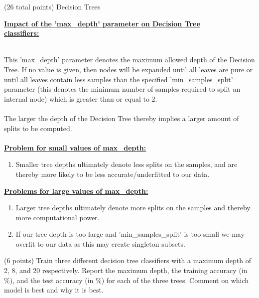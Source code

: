 \documentclass[12pt]{article}
\begin{document}
\begin{question}{(26 total points) Decision Trees}
\begin{subquestion}
\begin{answerbox}{32em}
\large{\textbf{\underline{Impact of the 'max\_depth' parameter on Decision Tree}}}\\
\large{\textbf{\underline{classifiers:}}}\\
\\
\normalsize{
This 'max\_depth' parameter denotes the maximum allowed depth of the Decision Tree. If no value is given, then nodes will be expanded until all leaves are pure or until all leaves contain less samples than the specified 'min\_samples\_split' parameter (this denotes the minimum number of samples required to split an internal node) which is greater than or equal to 2.\\
\\
The larger the depth of the Decision Tree thereby implies a larger amount of splits to be computed.\\
\\
\textbf{\underline{Problem for small values of max\_depth:}}
\begin{enumerate}
    \item Smaller tree depths ultimately denote less splits on the samples, and are thereby more likely to be less accurate/underfitted to our data.\\
\end{enumerate}
\textbf{\underline{Problems for large values of max\_depth:}}
\begin{enumerate}
    \item Larger tree depths ultimately denote more splits on the samples and thereby more computational power.
    \item If our tree depth is too large and 'min\_samples\_split' is too small we may overfit to our data as this may create singleton subsets.
\end{enumerate}
}
\end{answerbox}



\end{subquestion}


%
%
\begin{subquestion}{(6 points) 
Train three different decision tree classifiers with a maximum depth of 2, 8, and 20 respectively.
Report the maximum depth, the training accuracy (in \%), and the test accuracy (in \%) for each of the three trees.
Comment on which model is best and why it is best. \\
}



\end{subquestion}
\end{question}
\end{document}
